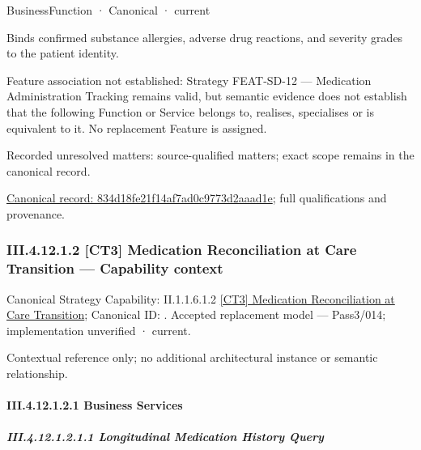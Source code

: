 \label{element:834d18fe21f14af7ad0c9773d2aaad1e}
{\small BusinessFunction · Canonical · current}\par

Binds confirmed substance allergies, adverse drug reactions, and severity grades to the patient identity.



Feature association not established: Strategy FEAT-SD-12 — Medication Administration Tracking remains valid, but semantic evidence does not establish that the following Function or Service belongs to, realises, specialises or is equivalent to it. No replacement Feature is assigned.


{\small Recorded unresolved matters: source-qualified matters; exact scope remains in the canonical record.}\par
{\footnotesize \href{../../../../../../../../continuum/business/business-function/834d18fe21f14af7ad0c9773d2aaad1e.md}{Canonical record: 834d18fe21f14af7ad0c9773d2aaad1e}; full qualifications and provenance.}\par
\subsubsection*{III.4.12.1.2 [CT3] Medication Reconciliation at Care Transition — Capability context}
\label{navigation:III.4.12.1.2}

{\small Canonical Strategy Capability: II.1.1.6.1.2 \hyperref[element:f7b8e469f8834d3ebdf6451f489310e9]{[CT3] Medication Reconciliation at Care Transition}; Canonical ID: \texttt{}. Accepted replacement model — Pass3/014; implementation unverified · current.}\par
Contextual reference only; no additional architectural instance or semantic relationship.\par
\paragraph*{III.4.12.1.2.1 Business Services}
\label{navigation:III.4.12.1.2.1}

\subparagraph*{III.4.12.1.2.1.1 Longitudinal Medication History Query}
\label{navigation:III.4.12.1.2.1.1}

